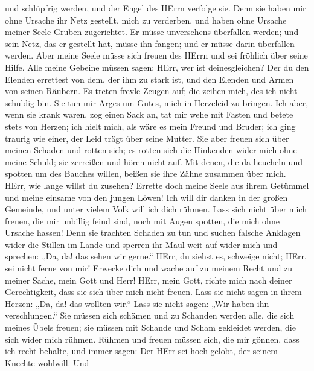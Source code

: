 und schlüpfrig werden, und der Engel des HErrn verfolge sie.
 Denn sie haben mir ohne Ursache ihr Netz gestellt, mich zu
verderben, und haben ohne Ursache meiner Seele Gruben zugerichtet.
 Er müsse unversehens überfallen werden; und sein Netz, das
er gestellt hat, müsse ihn fangen; und er müsse darin überfallen werden.
 Aber meine Seele müsse sich freuen des HErrn und sei
fröhlich über seine Hilfe.  Alle meine Gebeine müssen
sagen: HErr, wer ist deinesgleichen? Der du den Elenden errettest von
dem, der ihm zu stark ist, und den Elenden und Armen von seinen Räubern.
 Es treten frevle Zeugen auf; die zeihen mich, des ich
nicht schuldig bin.  Sie tun mir Arges um Gutes, mich in
Herzeleid zu bringen.  Ich aber, wenn sie krank waren, zog
einen Sack an, tat mir wehe mit Fasten und betete stets von Herzen;
 ich hielt mich, als wäre es mein Freund und Bruder; ich
ging traurig wie einer, der Leid trägt über seine Mutter. 
Sie aber freuen sich über meinen Schaden und rotten sich; es rotten sich
die Hinkenden wider mich ohne meine Schuld; sie zerreißen und hören
nicht auf.  Mit denen, die da heucheln und spotten um des
Bauches willen, beißen sie ihre Zähne zusammen über mich. 
HErr, wie lange willst du zusehen? Errette doch meine Seele aus ihrem
Getümmel und meine einsame von den jungen Löwen!  Ich will
dir danken in der großen Gemeinde, und unter vielem Volk will ich dich
rühmen.  Lass sich nicht über mich freuen, die mir unbillig
feind sind, noch mit Augen spotten, die mich ohne Ursache hassen!
 Denn sie trachten Schaden zu tun und suchen falsche
Anklagen wider die Stillen im Lande  und sperren ihr Maul
weit auf wider mich und sprechen: „Da, da! das sehen wir gerne.``
 HErr, du siehst es, schweige nicht; HErr, sei nicht ferne
von mir!  Erwecke dich und wache auf zu meinem Recht und zu
meiner Sache, mein Gott und Herr!  HErr, mein Gott, richte
mich nach deiner Gerechtigkeit, dass sie sich über mich nicht freuen.
 Lass sie nicht sagen in ihrem Herzen: „Da, da! das wollten
wir.`` Lass sie nicht sagen: „Wir haben ihn verschlungen.``
 Sie müssen sich schämen und zu Schanden werden alle, die
sich meines Übels freuen; sie müssen mit Schande und Scham gekleidet
werden, die sich wider mich rühmen.  Rühmen und freuen
müssen sich, die mir gönnen, dass ich recht behalte, und immer sagen:
Der HErr sei hoch gelobt, der seinem Knechte wohlwill.  Und
